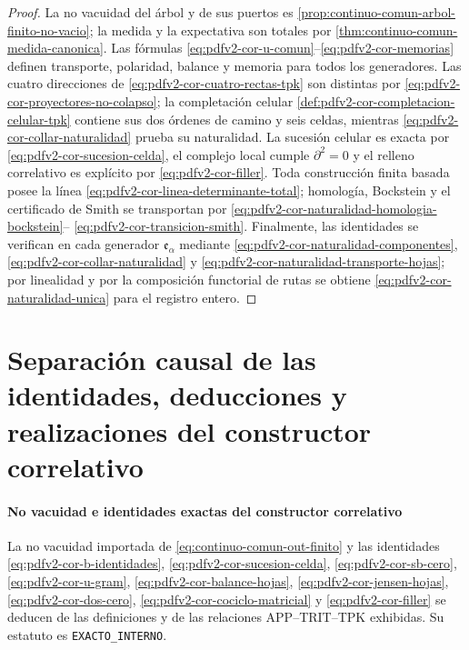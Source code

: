 \begin{proof}
La no vacuidad del árbol y de sus puertos es
\cref{prop:continuo-comun-arbol-finito-no-vacio}; la medida y la expectativa
son totales por \cref{thm:continuo-comun-medida-canonica}. Las fórmulas
  \eqref{eq:pdfv2-cor-u-comun}--\eqref{eq:pdfv2-cor-memorias} definen transporte,
polaridad, balance y memoria para todos los generadores. Las cuatro
  direcciones de \eqref{eq:pdfv2-cor-cuatro-rectas-tpk} son distintas por
  \eqref{eq:pdfv2-cor-proyectores-no-colapso}; la completación celular
  \cref{def:pdfv2-cor-completacion-celular-tpk} contiene sus dos órdenes de
  camino y seis celdas, mientras
  \eqref{eq:pdfv2-cor-collar-naturalidad} prueba su naturalidad. La
sucesión celular es exacta por \eqref{eq:pdfv2-cor-sucesion-celda}, el
complejo local cumple \(\partial^2=0\) y el relleno correlativo es explícito por
\eqref{eq:pdfv2-cor-filler}. Toda construcción finita basada posee la línea
\eqref{eq:pdfv2-cor-linea-determinante-total}; homología, Bockstein y el
certificado de Smith se transportan por
\eqref{eq:pdfv2-cor-naturalidad-homologia-bockstein}--
\eqref{eq:pdfv2-cor-transicion-smith}. Finalmente, las identidades se
verifican en cada generador \(\mathfrak e_\alpha\) mediante
\eqref{eq:pdfv2-cor-naturalidad-componentes},
\eqref{eq:pdfv2-cor-collar-naturalidad} y
\eqref{eq:pdfv2-cor-naturalidad-transporte-hojas}; por linealidad y por la
composición functorial de rutas se obtiene
\eqref{eq:pdfv2-cor-naturalidad-unica} para el registro entero.
\end{proof}

\section{Separación causal de las identidades, deducciones y realizaciones del constructor correlativo}

\paragraph{No vacuidad e identidades exactas del constructor correlativo}
La no vacuidad importada de \eqref{eq:continuo-comun-out-finito} y las
identidades
\eqref{eq:pdfv2-cor-b-identidades},
\eqref{eq:pdfv2-cor-sucesion-celda},
\eqref{eq:pdfv2-cor-sb-cero},
\eqref{eq:pdfv2-cor-u-gram},
\eqref{eq:pdfv2-cor-balance-hojas},
\eqref{eq:pdfv2-cor-jensen-hojas},
\eqref{eq:pdfv2-cor-dos-cero},
\eqref{eq:pdfv2-cor-cociclo-matricial} y
\eqref{eq:pdfv2-cor-filler} se deducen de las definiciones y de las relaciones
APP--TRIT--TPK exhibidas. Su estatuto es
\texttt{EXACTO\_INTERNO}.

